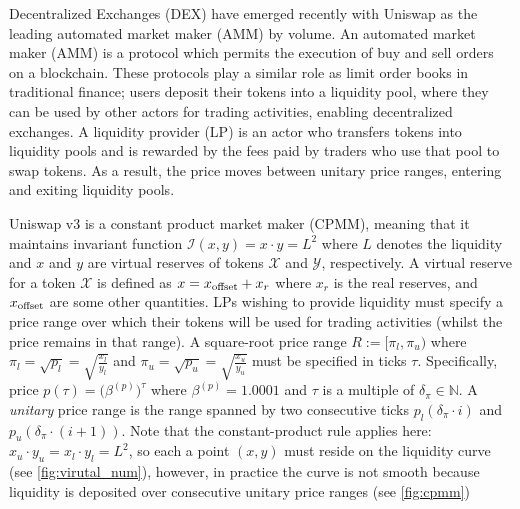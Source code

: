 \documentclass[11pt, letterpaper]{article}
\newcommand{\X}{\mathcal{X}}
\newcommand{\Y}{\mathcal{Y}}
\newcommand{\N}{\mathbb{N}}
\begin{document}
Decentralized Exchanges (DEX) have emerged recently with Uniswap as the leading automated market maker (AMM) by volume. 
An automated market maker (AMM) is a protocol which permits the execution of buy and sell orders on a blockchain. 
These protocols play a similar role as limit order books in traditional finance; users deposit their tokens into a liquidity pool, where they can be used by other actors for trading activities, enabling decentralized exchanges. 
A liquidity provider (LP) is an actor who transfers tokens into liquidity pools and is rewarded by the fees paid by traders who use that pool to swap tokens. As a result, the price moves between unitary price ranges, entering and exiting liquidity pools.

Uniswap v3 is a constant product market maker (CPMM), meaning that it maintains invariant function $\mathcal{I}(x,y)=x\cdot y =L^2$ where $L$ denotes the liquidity and $x$ and $y$ are virtual reserves of tokens $\X$ and $\Y$, respectively. A virtual reserve for a token $\X$ is defined as $x=x_{\rm offset} + x_r$ where $x_r$ is the real reserves, and $x_{\rm offset}$ are some other quantities.
LPs wishing to provide liquidity must specify a price range over which their tokens will be used for trading activities (whilst the price remains in that range).
A square-root price range $R:=[\pi_l,\pi_u)$ where $\pi_l=\sqrt{p_l}=\sqrt{\frac{x_l}{y_l}}$ and $\pi_u=\sqrt{p_u}=\sqrt{\frac{x_u}{y_u}}$ must be specified in ticks $\tau$. 
Specifically, price $p(\tau)=\Big(\beta^{(p)}\Big)^\tau$ where $\beta^{(p)}=1.0001$ and $\tau$ is a multiple of $\delta_\pi\in\N$. A \textit{unitary} price range is the range spanned by two consecutive ticks $p_l(\delta_\pi\cdot i)$ and $p_u(\delta_\pi\cdot (i+1))$. 
Note that the constant-product rule applies here: $x_u\cdot y_u = x_l\cdot y_l = L^2$, so each a point $(x,y)$ must reside on the liquidity curve (see \cref{fig:virutal_num}), however, in practice the curve is not smooth because liquidity is deposited over consecutive unitary price ranges (see \cref{fig:cpmm})
\end{document}
